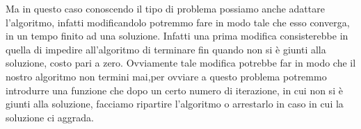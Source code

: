		Ma in questo caso conoscendo il tipo di problema possiamo anche adattare l'algoritmo, infatti modificandolo potremmo fare in modo tale che esso converga, in un tempo finito ad una soluzione.
		Infatti una prima modifica consisterebbe in quella di impedire all'algoritmo di terminare fin quando non si è giunti alla soluzione, costo pari a zero.
		Ovviamente tale modifica potrebbe far in modo che il nostro algoritmo non termini mai,per ovviare a questo problema potremmo introdurre una funzione che dopo un certo numero di iterazione, in cui non si è giunti alla soluzione, facciamo ripartire l'algoritmo o arrestarlo in caso in cui la soluzione ci aggrada.
		